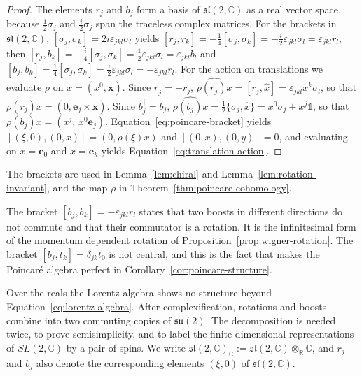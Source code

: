 \begin{proof}
	The elements $r_j$ and $b_j$ form a basis of $\mathfrak{sl}(2,\mathbb{C})$ as a real vector space, because $\tfrac12\sigma_j$ and $\tfrac i2\sigma_j$ span the traceless complex matrices. For the brackets in $\mathfrak{sl}(2,\mathbb{C})$, $[\sigma_j,\sigma_k]=2i\varepsilon_{jkl}\sigma_l$ yields $[r_j,r_k]=-\tfrac14[\sigma_j,\sigma_k]=-\tfrac i2\varepsilon_{jkl}\sigma_l=\varepsilon_{jkl}r_l$, then $[r_j,b_k]=-\tfrac i4[\sigma_j,\sigma_k]=\tfrac12\varepsilon_{jkl}\sigma_l=\varepsilon_{jkl}b_l$ and $[b_j,b_k]=\tfrac14[\sigma_j,\sigma_k]=\tfrac i2\varepsilon_{jkl}\sigma_l=-\varepsilon_{jkl}r_l$. For the action on translations we evaluate $\rho$ on $x=(x^0,\mathbf{x})$. Since $r_j^\dagger=-r_j$, $\widehat{\rho(r_j)x}=[r_j,\hat{x}]=\varepsilon_{jkl}x^k\sigma_l$, so that $\rho(r_j)x=(0,\mathbf{e}_j\times\mathbf{x})$. Since $b_j^\dagger=b_j$, $\widehat{\rho(b_j)x}=\tfrac12\{\sigma_j,\hat{x}\}=x^0\sigma_j+x^j\mathbb{1}$, so that $\rho(b_j)x=(x^j,\,x^0\mathbf{e}_j)$. Equation~\eqref{eq:poincare-bracket} yields $[(\xi,0),(0,x)]=(0,\rho(\xi)x)$ and $[(0,x),(0,y)]=0$, and evaluating on $x=\mathbf{e}_0$ and $x=\mathbf{e}_k$ yields Equation~\eqref{eq:translation-action}.
\end{proof}

\noindent The brackets are used in Lemma~\ref{lem:chiral} and Lemma~\ref{lem:rotation-invariant}, and the map $\rho$ in Theorem~\ref{thm:poincare-cohomology}.

\begin{remark}
	The bracket $[b_j,b_k]=-\varepsilon_{jkl}r_l$ states that two boosts in different directions do not commute and that their commutator is a rotation. It is the infinitesimal form of the momentum dependent rotation of Proposition~\ref{prop:wigner-rotation}. The bracket $[b_j,t_k]=\delta_{jk}t_0$ is not central, and this is the fact that makes the Poincar\'e algebra perfect in Corollary~\ref{cor:poincare-structure}.
\end{remark}

Over the reals the Lorentz algebra shows no structure beyond Equation~\eqref{eq:lorentz-algebra}. After complexification, rotations and boosts combine into two commuting copies of $\mathfrak{su}(2)$. The decomposition is needed twice, to prove semisimplicity, and to label the finite dimensional representations of $SL(2,\mathbb{C})$ by a pair of spins. We write $\mathfrak{sl}(2,\mathbb{C})_{\mathbb{C}}:=\mathfrak{sl}(2,\mathbb{C})\otimes_{\mathbb{R}}\mathbb{C}$, and $r_j$ and $b_j$ also denote the corresponding elements $(\xi,0)$ of $\mathfrak{sl}(2,\mathbb{C})$.

